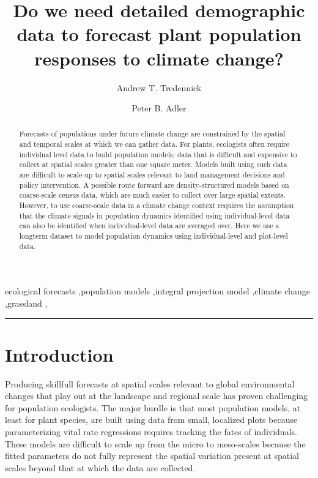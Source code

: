 \documentclass[author-year, 12pt,review]{components/elsarticle} %
\begin{document}
\begin{frontmatter}

  \title{Do we need detailed demographic data to forecast plant population
responses to climate change?}
    \author[usu]{Andrew T. Tredennick}
    \author[usu]{Peter B. Adler}
  
  
      \address[usu]{Department of Wildland Resources and the Ecology Center, Utah State
University, Logan, UT 84322, USA}    
  
  \begin{abstract}
  Forecasts of populations under future climate change are constrained by
  the spatial and temporal scales at which we can gather data. For plants,
  ecologists often require individual level data to build population
  models; data that is difficult and expensive to collect at spatial
  scales greater than one square meter. Models built using such data are
  difficult to scale-up to spatial scales relevant to land management
  decisions and policy intervention. A possible route forward are
  density-structured models based on coarse-scale census data, which are
  much easier to collect over large spatial extents. However, to use
  coarse-scale data in a climate change context requires the assumption
  that the climate signals in population dynamics identified using
  individual-level data can also be identified when individual-level data
  are averaged over. Here we use a longterm dataset to model population
  dynamics using individual-level and plot-level data.
  \end{abstract}
   \begin{keyword} ecological forecasts \sep population models \sep integral projection model \sep climate change \sep grassland \sep \end{keyword}
 \end{frontmatter}


\begin{center}\rule{3in}{0.4pt}\end{center}

\section{Introduction}\label{introduction}

Producing skillfull forecasts at spatial scales relevant to global
environmental changes that play out at the landscape and regional scale
has proven challenging for population ecologists. The major hurdle is
that most population models, at least for plant species, are built using
data from small, localized plots because parameterizing vital rate
regressions requires tracking the fates of individuals. These models are
difficult to scale up from the micro to meso-scales because the fitted
parameters do not fully represent the spatial variation present at
spatial scales beyond that at which the data are collected.
\end{document}
